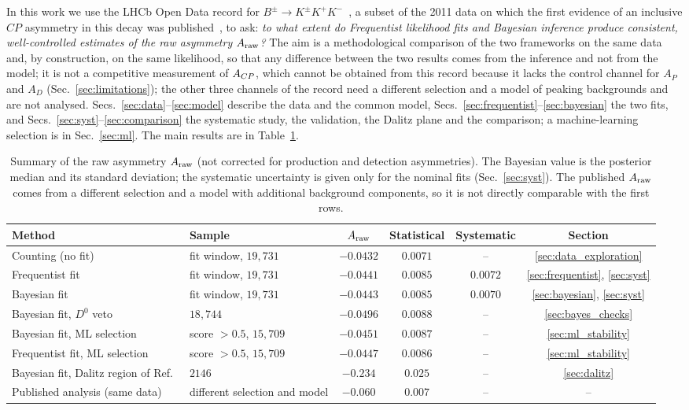 In this work we use the LHCb Open Data record for $B^{\pm}\to K^{\pm}K^{+}K^{-}$~\cite{opendata_record,opendata_notebook}, a subset of the 2011 data on which the first evidence of an inclusive $CP$ asymmetry in this decay was published~\cite{lhcb_cpv_2013}, to ask: \emph{to what extent do Frequentist likelihood fits and Bayesian inference produce consistent, well-controlled estimates of the raw asymmetry $A_{\mathrm{raw}}$?} The aim is a methodological comparison of the two frameworks on the same data and, by construction, on the same likelihood, so that any difference between the two results comes from the inference and not from the model; it is not a competitive measurement of $A_{CP}$, which cannot be obtained from this record because it lacks the control channel for $A_P$ and $A_D$ (Sec.~\ref{sec:limitations}); the other three channels of the record need a different selection and a model of peaking backgrounds and are not analysed. Secs.~\ref{sec:data}--\ref{sec:model} describe the data and the common model, Secs.~\ref{sec:frequentist}--\ref{sec:bayesian} the two fits, and Secs.~\ref{sec:syst}--\ref{sec:comparison} the systematic study, the validation, the Dalitz plane and the comparison; a machine-learning selection is in Sec.~\ref{sec:ml}. The main results are in Table~\ref{tab:summary}.

\begin{table}[t]
\centering
\begin{tabular}{llcccc}
\toprule
Method & Sample & $A_{\mathrm{raw}}$ & Statistical & Systematic & Section \\
\midrule
Counting (no fit) & fit window, $19{,}731$ & $-0.0432$ & $0.0071$ & -- & \ref{sec:data_exploration} \\
Frequentist fit & fit window, $19{,}731$ & $-0.0441$ & $0.0085$ & $0.0072$ & \ref{sec:frequentist}, \ref{sec:syst} \\
Bayesian fit & fit window, $19{,}731$ & $-0.0443$ & $0.0085$ & $0.0070$ & \ref{sec:bayesian}, \ref{sec:syst} \\
Bayesian fit, $D^0$ veto & $18{,}744$ & $-0.0496$ & $0.0088$ & -- & \ref{sec:bayes_checks} \\
Bayesian fit, ML selection & score $>0.5$, $15{,}709$ & $-0.0451$ & $0.0087$ & -- & \ref{sec:ml_stability} \\
Frequentist fit, ML selection & score $>0.5$, $15{,}709$ & $-0.0447$ & $0.0086$ & -- & \ref{sec:ml_stability} \\
Bayesian fit, Dalitz region of Ref.~\cite{lhcb_cpv_2013} & $2146$ & $-0.234$ & $0.025$ & -- & \ref{sec:dalitz} \\
\midrule
Published analysis (same data)~\cite{lhcb_cpv_2013} & different selection and model & $-0.060$ & $0.007$ & -- & -- \\
\bottomrule
\end{tabular}
\caption{Summary of the raw asymmetry $A_{\mathrm{raw}}$ (not corrected for production and detection asymmetries). The Bayesian value is the posterior median and its standard deviation; the systematic uncertainty is given only for the nominal fits (Sec.~\ref{sec:syst}). The published $A_{\mathrm{raw}}$ comes from a different selection and a model with additional background components, so it is not directly comparable with the first rows.}
\label{tab:summary}
\end{table}
